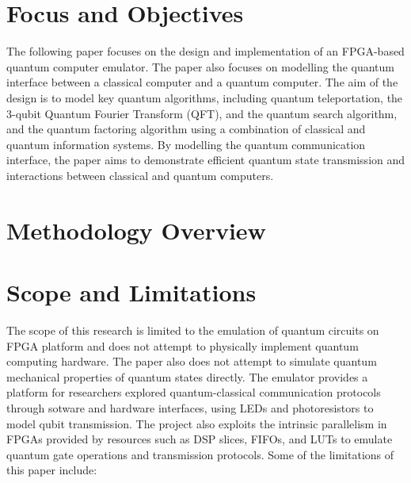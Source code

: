 \section{\label{sec:focus}Focus and Objectives}

The following paper focuses on the design and implementation of an FPGA-based quantum computer emulator. The paper also focuses on modelling the quantum interface between a classical computer and a quantum computer. The aim of the design is to model key quantum algorithms, including quantum teleportation, the 3-qubit Quantum Fourier Transform (QFT), and the quantum search algorithm, and the quantum factoring algorithm using a combination of classical and quantum information systems. By modelling the quantum communication interface, the paper aims to demonstrate efficient quantum state transmission and interactions between classical and quantum computers.

\section{\label{sec:methology_overview}Methodology Overview}


\section{Scope and Limitations}

The scope of this research is limited to the emulation of quantum circuits on FPGA platform and does not attempt to physically implement quantum computing hardware. The paper also does not attempt to simulate quantum mechanical properties of quantum states directly. The emulator provides a platform for researchers explored quantum-classical communication protocols through sotware and hardware interfaces, using LEDs and photoresistors to model qubit transmission. The project also exploits the intrinsic parallelism in FPGAs provided by resources such as DSP slices, FIFOs, and LUTs to emulate quantum gate operations and transmission protocols. Some of the limitations of this paper include:

